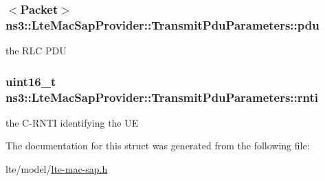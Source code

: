 \subsubsection[{\texorpdfstring{pdu}{pdu}}]{$<${\bf Packet}$>$ ns3\+::\+Lte\+Mac\+Sap\+Provider\+::\+Transmit\+Pdu\+Parameters\+::pdu}\hypertarget{structns3_1_1LteMacSapProvider_1_1TransmitPduParameters_aa12a35fa0d1f02ba064862815b129ae2}{}\label{structns3_1_1LteMacSapProvider_1_1TransmitPduParameters_aa12a35fa0d1f02ba064862815b129ae2}
the R\+LC P\+DU 
\subsubsection[{\texorpdfstring{rnti}{rnti}}]{\setlength{\rightskip}{0pt plus 5cm}uint16\+\_\+t ns3\+::\+Lte\+Mac\+Sap\+Provider\+::\+Transmit\+Pdu\+Parameters\+::rnti}\hypertarget{structns3_1_1LteMacSapProvider_1_1TransmitPduParameters_a07d41388b3041bdba571683e474af540}{}\label{structns3_1_1LteMacSapProvider_1_1TransmitPduParameters_a07d41388b3041bdba571683e474af540}
the C-\/\+R\+N\+TI identifying the UE 

The documentation for this struct was generated from the following file\+:\begin{DoxyCompactItemize}
\item 
lte/model/\hyperlink{lte-mac-sap_8h}{lte-\/mac-\/sap.\+h}\end{DoxyCompactItemize}
